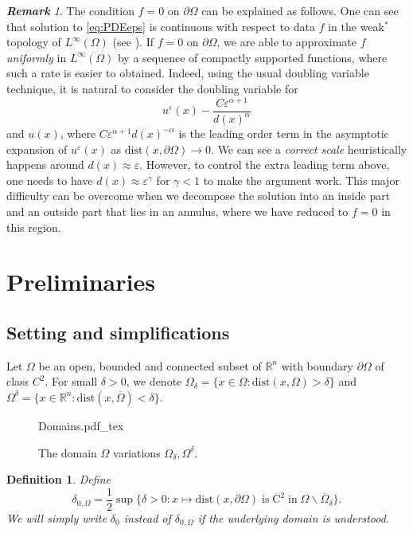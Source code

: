 \documentclass[11pt,reqno]{amsart}
\numberwithin{figure}{section}
\theoremstyle{plain}
\newtheorem{defn}{Definition}
\theoremstyle{remark}
\newtheorem{rem}{\bf{Remark}}
\numberwithin{equation}{section}
\newcommand{\rmC}{\mathrm{C}}
\newcommand{\incfig}[1]{%
    \def\svgwidth{\columnwidth}
    {#1.pdf_tex}
}
\begin{document}
\begin{rem} The condition $f = 0$ on $\partial\Omega$ can be explained as follows. One can see that solution to \eqref{eq:PDEeps} is continuous with respect to data $f$ in the weak$^*$ topology of $L^\infty(\Omega)$ (see \cite{Lasry1989}). If $f = 0$ on $\partial\Omega$, we are able to approximate $f$ \emph{uniformly} in $L^\infty(\Omega)$ by a sequence of compactly supported functions, where such a rate is easier to obtained. Indeed, using the usual doubling variable technique, it is natural to consider the doubling variable for
\begin{equation*}
    u^\varepsilon(x) - \frac{C\varepsilon^{\alpha+1}}{d(x)^{\alpha}}
\end{equation*}
and $u(x)$, where $C\varepsilon^{\alpha+1}d(x)^{-\alpha}$ is the leading order term in the asymptotic expansion of $u^\varepsilon(x)$ as $\mathrm{dist}(x,\partial\Omega)\to 0$. We can see a \emph{correct scale} heuristically happens around $d(x) \approx \varepsilon$. However, to control the extra leading term above, one needs to have $d(x)\approx \varepsilon^\gamma$ for $\gamma < 1$ to make the argument work. This major difficulty can be overcome when we decompose the solution into an inside part and an outside part that lies in an annulus, where we have reduced to $f=0$ in this region.
\end{rem}

\section{Preliminaries}\label{sec:prelim} 
\subsection{Setting and simplifications} Let $\Omega$ be an open, bounded and connected subset of $\mathbb{R}^n$ with boundary $\partial\Omega$ of class $C^2$. For small $\delta>0$, we denote $\Omega_\delta = \{x\in \Omega: \mathrm{dist}(x,\Omega) > \delta\}$ and $\Omega^\delta = \{x\in \mathbb{R}^n: \mathrm{dist}(x,\overline{\Omega}) < \delta\}$. 
\begin{figure}[ht]
    \centering
    \def\svgwidth{0.47\columnwidth}
    {Domains.pdf_tex}
    \caption{The domain $\Omega$ variations $\Omega_\delta, \Omega^\delta$.}
    \label{fig:Domains}
\end{figure}

\begin{defn} Define
\begin{equation}\label{def:delta_0}
    \delta_{0,\Omega} =\frac{1}{2}\sup \big\{ \delta > 0: x\mapsto\mathrm{dist}(x,\partial\Omega)\;\text{is}\;\rmC^2\;\text{in}\;\Omega\backslash\overline{\Omega}_{\delta} \big\}.
\end{equation}
We will simply write $\delta_0$ instead of $\delta_{0,\Omega}$ if the underlying domain is understood.
\end{defn}
\end{document}
